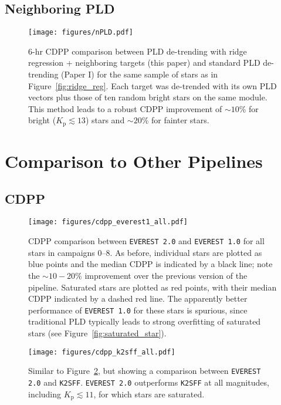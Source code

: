 \documentclass[]{emulateapj}
\newcommand{\Kp}{\ensuremath{K_\mathrm{p}}}
\begin{document}
\subsection{Neighboring PLD}
\begin{figure}[ht]
  \begin{center}
      \texttt{[image: figures/nPLD.pdf]}
       \caption{6-hr CDPP comparison between PLD de-trending with ridge regression + neighboring targets 
                (this paper) and standard PLD de-trending (Paper I) for the same sample of stars as in Figure~\ref{fig:ridge_reg}.
                Each target was de-trended with its own PLD vectors plus those of ten random bright stars
                on the same module. This method leads to a robust CDPP improvement of ${\sim}10$\% for bright ($\Kp \lesssim 13$) stars
                and ${\sim}20$\% for fainter stars.}
     \label{fig:nPLD}
  \end{center}
\end{figure}

\section{Comparison to Other Pipelines}
\label{sec:comparison}

\subsection{CDPP}

\begin{figure}[ht]
  \begin{center}
      \texttt{[image: figures/cdpp\_everest1\_all.pdf]}
       \caption{CDPP comparison between \texttt{EVEREST 2.0} and \texttt{EVEREST 1.0} for all stars in campaigns 0--8.
       As before, individual stars are plotted as blue points and the median CDPP is indicated by a black line; note
       the ${\sim}10-20$\% improvement over the previous version of the pipeline. Saturated
       stars are plotted as red points, with their median CDPP indicated by a dashed red line. The apparently
       better performance of \texttt{EVEREST 1.0} for these stars is spurious, since traditional PLD typically
       leads to strong overfitting of saturated stars (see Figure~\ref{fig:saturated_star}).}
     \label{fig:cdpp_everest1_all}
  \end{center}
\end{figure}

\begin{figure}[ht]
  \begin{center}
      \texttt{[image: figures/cdpp\_k2sff\_all.pdf]}
       \caption{Similar to Figure~\ref{fig:cdpp_everest1_all}, but showing a comparison between \texttt{EVEREST 2.0} and \texttt{K2SFF}.
       \texttt{EVEREST 2.0} outperforms \texttt{K2SFF} at all magnitudes, including $\Kp \lesssim 11$, for which stars are saturated.}
     \label{fig:cdpp_k2sff_all}
  \end{center}
\end{figure}
\end{document}
